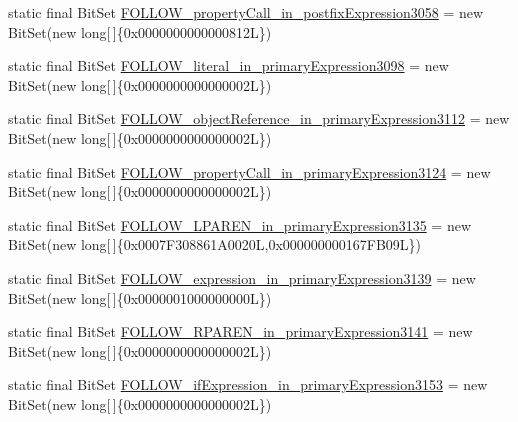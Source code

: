 \begin{DoxyCompactItemize}
\item 
static final Bit\-Set \hyperlink{classorg_1_1tzi_1_1use_1_1parser_1_1soil_1_1_soil_parser_af351ce5a85d5ba9a1fb230c093043430}{F\-O\-L\-L\-O\-W\-\_\-property\-Call\-\_\-in\-\_\-postfix\-Expression3058} = new Bit\-Set(new long\mbox{[}$\,$\mbox{]}\{0x0000000000000812\-L\})
\item 
static final Bit\-Set \hyperlink{classorg_1_1tzi_1_1use_1_1parser_1_1soil_1_1_soil_parser_acc0ffc4adc442df68e3c443e65bb5b03}{F\-O\-L\-L\-O\-W\-\_\-literal\-\_\-in\-\_\-primary\-Expression3098} = new Bit\-Set(new long\mbox{[}$\,$\mbox{]}\{0x0000000000000002\-L\})
\item 
static final Bit\-Set \hyperlink{classorg_1_1tzi_1_1use_1_1parser_1_1soil_1_1_soil_parser_af4cfb06b32d1f5b113661beede8054f9}{F\-O\-L\-L\-O\-W\-\_\-object\-Reference\-\_\-in\-\_\-primary\-Expression3112} = new Bit\-Set(new long\mbox{[}$\,$\mbox{]}\{0x0000000000000002\-L\})
\item 
static final Bit\-Set \hyperlink{classorg_1_1tzi_1_1use_1_1parser_1_1soil_1_1_soil_parser_a19cabd554fc8ac197bab811f4e3709f4}{F\-O\-L\-L\-O\-W\-\_\-property\-Call\-\_\-in\-\_\-primary\-Expression3124} = new Bit\-Set(new long\mbox{[}$\,$\mbox{]}\{0x0000000000000002\-L\})
\item 
static final Bit\-Set \hyperlink{classorg_1_1tzi_1_1use_1_1parser_1_1soil_1_1_soil_parser_a060437d5be043de4a78910385cd7648b}{F\-O\-L\-L\-O\-W\-\_\-\-L\-P\-A\-R\-E\-N\-\_\-in\-\_\-primary\-Expression3135} = new Bit\-Set(new long\mbox{[}$\,$\mbox{]}\{0x0007\-F308861\-A0020\-L,0x000000000167\-F\-B09\-L\})
\item 
static final Bit\-Set \hyperlink{classorg_1_1tzi_1_1use_1_1parser_1_1soil_1_1_soil_parser_af1c19d322ae03f2816924db771db3bae}{F\-O\-L\-L\-O\-W\-\_\-expression\-\_\-in\-\_\-primary\-Expression3139} = new Bit\-Set(new long\mbox{[}$\,$\mbox{]}\{0x0000001000000000\-L\})
\item 
static final Bit\-Set \hyperlink{classorg_1_1tzi_1_1use_1_1parser_1_1soil_1_1_soil_parser_ac0a1be8d9de43a594e0a6c52ad22c1c5}{F\-O\-L\-L\-O\-W\-\_\-\-R\-P\-A\-R\-E\-N\-\_\-in\-\_\-primary\-Expression3141} = new Bit\-Set(new long\mbox{[}$\,$\mbox{]}\{0x0000000000000002\-L\})
\item 
static final Bit\-Set \hyperlink{classorg_1_1tzi_1_1use_1_1parser_1_1soil_1_1_soil_parser_af67d743bb70b9887827c8d5cce4f6181}{F\-O\-L\-L\-O\-W\-\_\-if\-Expression\-\_\-in\-\_\-primary\-Expression3153} = new Bit\-Set(new long\mbox{[}$\,$\mbox{]}\{0x0000000000000002\-L\})
\item 

\end{DoxyCompactItemize}
